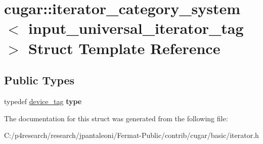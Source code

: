 \hypertarget{structcugar_1_1iterator__category__system_3_01input__universal__iterator__tag_01_4}{}\section{cugar\+:\+:iterator\+\_\+category\+\_\+system$<$ input\+\_\+universal\+\_\+iterator\+\_\+tag $>$ Struct Template Reference}
\label{structcugar_1_1iterator__category__system_3_01input__universal__iterator__tag_01_4}
\subsection*{Public Types}
\begin{DoxyCompactItemize}
\item 
\mbox{\label{structcugar_1_1iterator__category__system_3_01input__universal__iterator__tag_01_4_af2d4b0b757b7ac1e1a5275a79bd38fcc}} 
typedef \hyperlink{structcugar_1_1device__tag}{device\+\_\+tag} {\bfseries type}
\end{DoxyCompactItemize}


The documentation for this struct was generated from the following file\+:\begin{DoxyCompactItemize}
\item 
C\+:/p4research/research/jpantaleoni/\+Fermat-\/\+Public/contrib/cugar/basic/iterator.\+h\end{DoxyCompactItemize}
